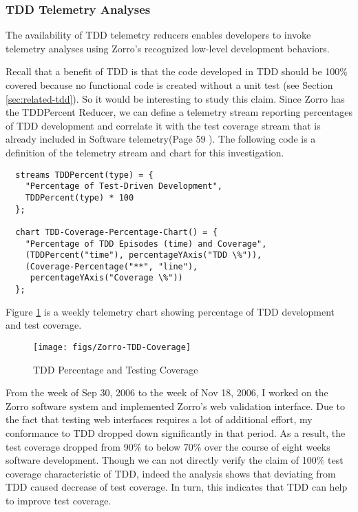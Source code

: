 \subsubsection{TDD Telemetry Analyses}
The availability of TDD telemetry reducers enables developers to 
invoke telemetry analyses using Zorro's recognized 
low-level development behaviors. 

Recall that a benefit of TDD is that the code developed in TDD
should be 100\% covered because no functional code is created
without a unit test (see Section \ref{sec:related-tdd}). So it 
would be interesting to study this claim. Since Zorro has the
TDDPercent Reducer, we can define a telemetry stream
reporting percentages of TDD development and correlate it with
the test coverage stream that is already included in Software
telemetry(Page 59 \cite{csdl2-06-05}). The following code
is a definition of the telemetry stream and chart for this
investigation.
\begin{verbatim}
  streams TDDPercent(type) = {
    "Percentage of Test-Driven Development", 
    TDDPercent(type) * 100
  };

  chart TDD-Coverage-Percentage-Chart() = {
    "Percentage of TDD Episodes (time) and Coverage", 
    (TDDPercent("time"), percentageYAxis("TDD \%")),
    (Coverage-Percentage("**", "line"), 
     percentageYAxis("Coverage \%"))
  };
\end{verbatim}

Figure \ref{fig:Zorro-Analysis-TDDPercentCoverage} 
is a weekly telemetry chart showing percentage of TDD development 
and test coverage.
\begin{figure}[htbp]
  \centering
  \texttt{[image: figs/Zorro-TDD-Coverage]}
  \caption{TDD Percentage and Testing Coverage}
  \label{fig:Zorro-Analysis-TDDPercentCoverage}
\end{figure}
From the week of Sep 30, 2006 to the week of Nov 18, 2006, I worked on the
Zorro software system and implemented Zorro's web validation interface.
Due to the fact that testing web interfaces requires a lot of additional
effort, my conformance to TDD dropped down significantly in that period. As
a result, the test coverage dropped from 90\% to below 70\% over the course
of eight weeks software development. Though we can not directly verify the
claim of 100\% test coverage characteristic of TDD, indeed the analysis
shows that deviating from TDD caused decrease of test coverage. In turn,
this indicates that TDD can help to improve test coverage.

